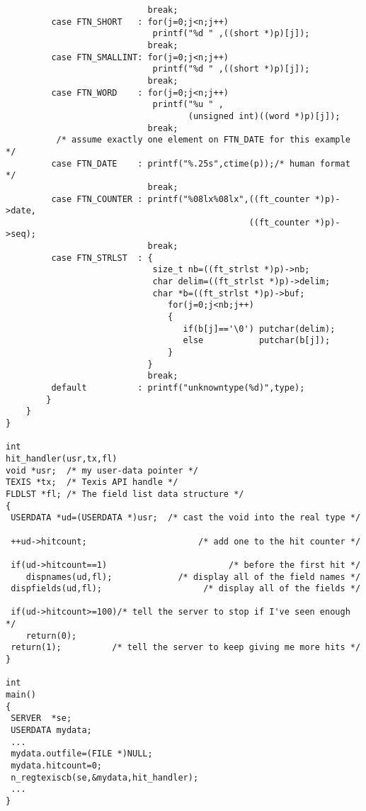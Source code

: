 \begin{verbatim}
                            break;
         case FTN_SHORT   : for(j=0;j<n;j++)
                             printf("%d " ,((short *)p)[j]);
                            break;
         case FTN_SMALLINT: for(j=0;j<n;j++)
                             printf("%d " ,((short *)p)[j]);
                            break;
         case FTN_WORD    : for(j=0;j<n;j++)
                             printf("%u " ,
                                    (unsigned int)((word *)p)[j]);
                            break;
          /* assume exactly one element on FTN_DATE for this example */
         case FTN_DATE    : printf("%.25s",ctime(p));/* human format */
                            break;
         case FTN_COUNTER : printf("%08lx%08lx",((ft_counter *)p)->date,
                                                ((ft_counter *)p)->seq);
                            break;
         case FTN_STRLST  : {
                             size_t nb=((ft_strlst *)p)->nb;
                             char delim=((ft_strlst *)p)->delim;
                             char *b=((ft_strlst *)p)->buf;
                                for(j=0;j<nb;j++)
                                {
                                   if(b[j]=='\0') putchar(delim);
                                   else           putchar(b[j]);
                                }
                            }
                            break;
         default          : printf("unknowntype(%d)",type);
        }
    }
}

int
hit_handler(usr,tx,fl)
void *usr;  /* my user-data pointer */
TEXIS *tx;  /* Texis API handle */
FLDLST *fl; /* The field list data structure */
{
 USERDATA *ud=(USERDATA *)usr;  /* cast the void into the real type */

 ++ud->hitcount;                      /* add one to the hit counter */

 if(ud->hitcount==1)                        /* before the first hit */
    dispnames(ud,fl);             /* display all of the field names */
 dispfields(ud,fl);                    /* display all of the fields */

 if(ud->hitcount>=100)/* tell the server to stop if I've seen enough */
    return(0);
 return(1);          /* tell the server to keep giving me more hits */
}

int
main()
{
 SERVER  *se;
 USERDATA mydata;
 ...
 mydata.outfile=(FILE *)NULL;
 mydata.hitcount=0;
 n_regtexiscb(se,&mydata,hit_handler);
 ...
}

\end{verbatim}

